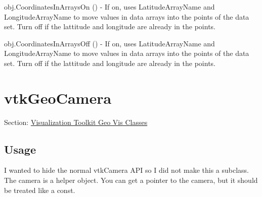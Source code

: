 \begin{DoxyItemize}
\item {\ttfamily obj.\-Coordinates\-In\-Arrays\-On ()} -\/ If on, uses Latitude\-Array\-Name and Longitude\-Array\-Name to move values in data arrays into the points of the data set. Turn off if the lattitude and longitude are already in the points.  
\item {\ttfamily obj.\-Coordinates\-In\-Arrays\-Off ()} -\/ If on, uses Latitude\-Array\-Name and Longitude\-Array\-Name to move values in data arrays into the points of the data set. Turn off if the lattitude and longitude are already in the points.  
\end{DoxyItemize}\hypertarget{vtkgeovis_vtkgeocamera}{}\section{vtk\-Geo\-Camera}\label{vtkgeovis_vtkgeocamera}
Section\-: \hyperlink{sec_vtkgeovis}{Visualization Toolkit Geo Vis Classes} \hypertarget{vtkwidgets_vtkxyplotwidget_Usage}{}\subsection{Usage}\label{vtkwidgets_vtkxyplotwidget_Usage}
I wanted to hide the normal vtk\-Camera A\-P\-I so I did not make this a subclass. The camera is a helper object. You can get a pointer to the camera, but it should be treated like a const.

